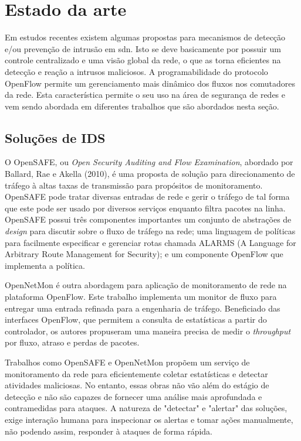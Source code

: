 \chapter{Estado da arte}
\label{cap:trabalhos-relacionados}

Em estudos recentes existem algumas propostas para mecanismos de detecção e/ou prevenção de intrusão em \gls{sdn}. Isto se deve basicamente por possuir um controle centralizado e uma visão global da rede, o que as torna eficientes na detecção e reação a intrusos maliciosos. A programabilidade do protocolo OpenFlow permite um gerenciamento mais dinâmico dos fluxos nos comutadores da rede. Esta característica permite o seu uso na área de segurança de redes e vem sendo abordada em diferentes trabalhos que são abordados nesta seção.

\section{Soluções de IDS}

O OpenSAFE, ou \textit{Open Security Auditing and Flow Examination}, abordado por Ballard, Rae e Akella (2010)\nocite{Ballard:2010}, é uma proposta de solução para direcionamento de tráfego à altas taxas de transmissão para propósitos de monitoramento. OpenSAFE pode tratar diversas entradas de rede e gerir o tráfego de tal forma que este pode ser usado por diversos serviços enquanto filtra pacotes na linha. 
OpenSAFE possui três componentes importantes um conjunto de abstrações de \textit{design} para discutir sobre o fluxo de tráfego na rede; uma linguagem de políticas para facilmente especificar e gerenciar rotas chamada ALARMS (A Language for Arbitrary Route Management for Security); e um componente OpenFlow que implementa a política. 

OpenNetMon \cite{Adrichem:2014} é outra abordagem para aplicação de monitoramento de rede na plataforma OpenFlow. Este trabalho implementa um monitor de fluxo para entregar uma entrada refinada para a engenharia de tráfego. Beneficiado das interfaces OpenFlow, que permitem a consulta de estatísticas a partir do controlador, os autores propuseram uma maneira precisa de medir o \textit{throughput} por fluxo, atraso e perdas de pacotes.

Trabalhos como OpenSAFE \cite{Ballard:2010} e OpenNetMon \cite{Adrichem:2014} propõem um serviço de monitoramento da rede para eficientemente coletar estatísticas e detectar atividades maliciosas. No entanto, essas obras não vão além do estágio de detecção e não são capazes de fornecer uma análise mais aprofundada e contramedidas para ataques. A natureza de "detectar" e "alertar" das soluções, exige interação humana para inspecionar os alertas e tomar ações manualmente, não podendo assim, responder à ataques de forma rápida.



